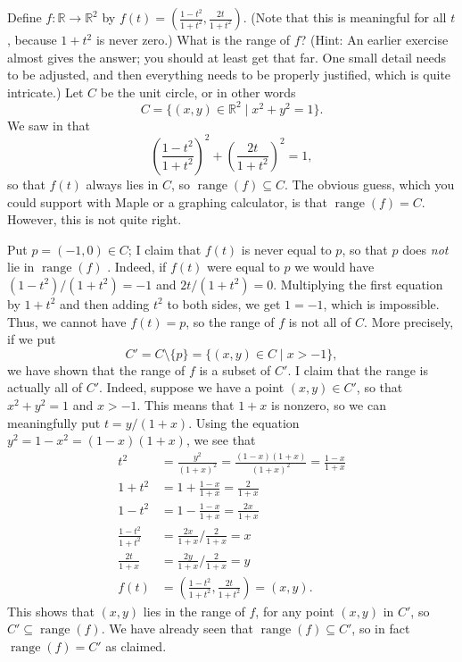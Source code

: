 \documentclass[a4paper]{book}
\newcommand{\RED}[1]{{\color{red}#1}}
\newcommand{\R}         {{\mathbb{R}}}
\newcommand{\sm}        {\setminus}
\newcommand{\sse}       {\subseteq}
\newcommand{\st}        {\;|\;}
\newcommand{\xra}       {\xrightarrow}
\newcommand{\range}     {\operatorname{range}}
\renewcommand{\:}{\colon}
\newcommand{\EMPH}[1]{\RED{\emph{#1}}}
\theoremstyle{definition}
\newenvironment{sstarex}{
 \renewcommand{\thetheorem}{\arabic{chapter}.\arabic{section}.\arabic{theorem}${}^{**}$}
 \exercise
}{\endexercise}
\renewenvironment{solution}{\SolutionInline}{\endSolutionInline}
\begin{document}
\begin{sstarex}
 Define $f\:\R\xra{}\R^2$ by
 $f(t)=(\frac{1-t^2}{1+t^2},\frac{2t}{1+t^2})$.  (Note that this is
 meaningful for all $t$, because $1+t^2$ is never zero.)  What is the
 range of $f$?  (Hint: An earlier exercise almost gives the answer;
 you should at least get that far.  One small detail needs to be
 adjusted, and then everything needs to be properly justified, which
 is quite intricate.)
\end{sstarex}
\begin{solution}
 Let $C$ be the unit circle, or in other words
 \[ C = \{(x,y)\in\R^2 \st x^2+y^2 = 1\}. \]
 We saw in  that
 \[ \left(\frac{1-t^2}{1+t^2}\right)^2 +
    \left(\frac{2t}{1+t^2}\right)^2 = 1,
 \]
 so that $f(t)$ always lies in $C$, so $\range(f)\sse C$.  The obvious
 guess, which you could support with Maple or a graphing calculator,
 is that $\range(f)=C$.  However, this is not quite right.
 
 Put $p=(-1,0)\in C$; I claim that $f(t)$ is never equal to $p$, so
 that $p$ does \EMPH{not} lie in $\range(f)$ .  Indeed, if $f(t)$ were
 equal to $p$ we would have $(1-t^2)/(1+t^2)=-1$ and $2t/(1+t^2)=0$.
 Multiplying the first equation by $1+t^2$ and then adding $t^2$ to
 both sides, we get $1=-1$, which is impossible.  Thus, we cannot have
 $f(t)=p$, so the range of $f$ is not all of $C$.  More precisely, if
 we put
 \[ C'=C\sm\{p\} = \{(x,y)\in C \st x>-1\}, \]
 we have shown that the range of $f$ is a subset of $C'$.  I claim
 that the range is actually all of $C'$.  Indeed, suppose we have a
 point $(x,y)\in C'$, so that $x^2+y^2=1$ and $x>-1$.  This means that
 $1+x$ is nonzero, so we can meaningfully put $t=y/(1+x)$.  Using the
 equation $y^2=1-x^2=(1-x)(1+x)$, we see that
 \begin{align*}
  t^2 &= \frac{y^2}{(1+x)^2} = \frac{(1-x)(1+x)}{(1+x)^2}
          = \frac{1-x}{1+x} \\
  1+t^2 &= 1 + \frac{1-x}{1+x} = \frac{2}{1+x} \\
  1-t^2 &= 1 - \frac{1-x}{1+x} = \frac{2x}{1+x} \\
  \frac{1-t^2}{1+t^2} &= \frac{2x}{1+x}/\frac{2}{1+x} = x \\
  \frac{2t}{1+x}      &= \frac{2y}{1+x}/\frac{2}{1+x} = y \\
  f(t) &= \left(\frac{1-t^2}{1+t^2},\frac{2t}{1+t^2}\right)
          = (x,y).
 \end{align*}
 This shows that $(x,y)$ lies in the range of $f$, for any point
 $(x,y)$ in $C'$, so $C'\sse\range(f)$.  We have already seen that
 $\range(f)\sse C'$, so in fact $\range(f)=C'$ as claimed.
\end{solution}
\end{document}
